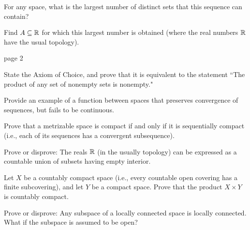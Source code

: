\documentclass[bbb]{report}
\begin{document}
\begin{large}
\begin{description}
{\vspace{.5in}

\item[\quad (a)] For any space, what is the largest number of
distinct sets that this sequence can contain?

\vspace{.5in}

\item[\quad (b)] Find $A\subseteq{\Bbb R}$ for which this largest
number is obtained (where the real numbers ${\Bbb R}$ have the
usual topology).

\pagebreak

\hfill page 2
\par

\vspace{.5in}

\item[6.] State the Axiom of Choice, and prove that it is
equivalent to the statement ``The product of any set of nonempty
sets is nonempty."

\vspace{.5in}

\item[7.] Provide an example of a function between spaces that
preserves convergence of sequences, but fails to be continuous.

\vspace{.5in}

\item[8.] Prove that a metrizable space is compact if and
only if it is sequentially compact (i.e., each of its sequences
has a convergent subsequence).

\vspace{.5in}

\item[9.] Prove or disprove: The reals ${\Bbb R}$ (in the usually
topology) can be expressed as a countable union of subsets having
empty interior.

\vspace{.5in}

\item[10.] Let $X$ be a countably compact space (i.e., every
countable open covering has a finite subcovering), and let $Y$ be
a compact space. Prove that the product $X\times Y$ is countably
compact.

\vspace{.5in}

\item[11.] Prove or disprove: Any subspace of a locally connected
space is locally connected. What if the subspace is assumed to be
open?

}
\end{description}
\end{large}
\end{document}
